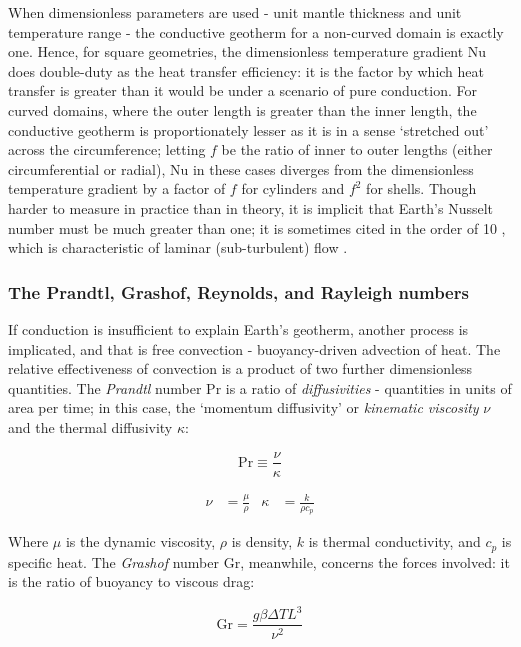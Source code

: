 \documentclass[a4paper,11pt,oneside]{book}
\begin{document}
When dimensionless parameters are used - unit mantle thickness and unit temperature range - the conductive geotherm for a non-curved domain is exactly one. Hence, for square geometries, the dimensionless temperature gradient $\mathrm{Nu}$ does double-duty as the heat transfer efficiency: it is the factor by which heat transfer is greater than it would be under a scenario of pure conduction. For curved domains, where the outer length is greater than the inner length, the conductive geotherm is proportionately lesser as it is in a sense `stretched out' across the circumference; letting $f$ be the ratio of inner to outer lengths (either circumferential or radial), $\mathrm{Nu}$ in these cases diverges from the dimensionless temperature gradient by a factor of $f$ for cylinders and $f^2$ for shells. Though harder to measure in practice than in theory, it is implicit that Earth's Nusselt number must be much greater than one; it is sometimes cited in the order of 10 \cite{Tackley1996-vw}, which is characteristic of laminar (sub-turbulent) flow \cite{White1984-fn}.

\subsubsection{The Prandtl, Grashof, Reynolds, and Rayleigh numbers}

If conduction is insufficient to explain Earth's geotherm, another process is implicated, and that is free convection - buoyancy-driven advection of heat. The relative effectiveness of convection is a product of two further dimensionless quantities. The \textit{Prandtl} number $\mathrm{Pr}$ is a ratio of \textit{diffusivities} - quantities in units of area per time; in this case, the `momentum diffusivity' or \textit{kinematic viscosity} $\nu$ and the thermal diffusivity $\kappa$:

\begin{equation}
\mathrm{Pr} \equiv \frac{\nu}{\kappa}
\end{equation}

\begin{align} \nu &= \frac{\mu}{\rho} & \kappa &= \frac{k}{\rho c_p} \end{align}

Where $\mu$ is the dynamic viscosity, $\rho$ is density, $k$ is thermal conductivity, and $c_p$ is specific heat. The \textit{Grashof} number $\mathrm{Gr}$, meanwhile, concerns the forces involved: it is the ratio of buoyancy to viscous drag:

\begin{equation}
\mathrm{Gr} = \frac{g \beta \Delta T L^3}{\nu ^2}
\end{equation}
\end{document}
